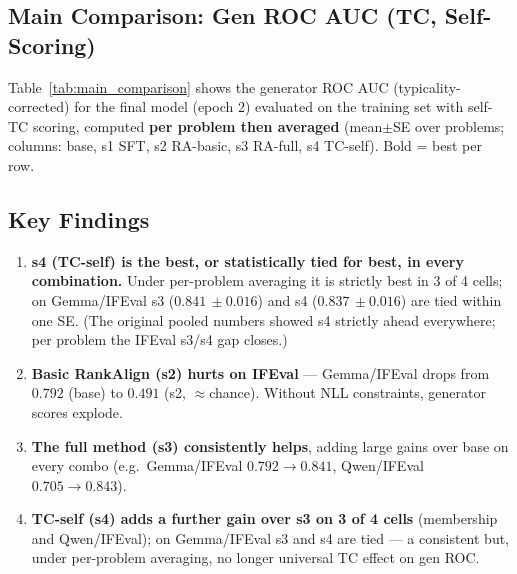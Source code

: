 \documentclass[11pt,a4paper]{article}
\newcommand{\se}[1]{{\,\scriptstyle\pm#1}}
\begin{document}
\subsection{Main Comparison: Gen ROC AUC (TC, Self-Scoring)}

Table~\ref{tab:main_comparison} shows the generator ROC AUC (typicality-corrected) for the final
model (epoch 2) evaluated on the training set with self-TC scoring, computed \textbf{per problem
then averaged} (mean$\pm$SE over problems; columns: base, s1 SFT, s2 RA-basic, s3 RA-full, s4
TC-self). Bold = best per row.

\begin{table}[H]
\centering
\caption{Generator ROC AUC (TC, self-scoring) at epoch 2, per-problem mean$\pm$SE. Bold = best per
row. (Original pooled values: Gemma/Mem 0.851/0.941/0.948/0.976; Gemma/IFEval
0.670/0.586/0.482/0.753/0.801; Qwen/Mem 0.799/0.902/0.880/0.899/0.969; Qwen/IFEval
0.606/0.599/0.558/0.711/0.743.)}
\label{tab:main_comparison}

\end{table}

\subsection{Key Findings}

\begin{enumerate}
\item \textbf{s4 (TC-self) is the best, or statistically tied for best, in every combination.}
Under per-problem averaging it is strictly best in 3 of 4 cells; on Gemma/IFEval s3 ($0.841\se{0.016}$) and s4 ($0.837\se{0.016}$) are tied within one SE. (The original pooled numbers showed s4 strictly ahead everywhere; per problem the IFEval s3/s4 gap closes.)
\item \textbf{Basic RankAlign (s2) hurts on IFEval} --- Gemma/IFEval drops from $0.792$ (base) to $0.491$ (s2, $\approx$chance). Without NLL constraints, generator scores explode.
\item \textbf{The full method (s3) consistently helps}, adding large gains over base on every combo (e.g.\ Gemma/IFEval $0.792\!\to\!0.841$, Qwen/IFEval $0.705\!\to\!0.843$).
\item \textbf{TC-self (s4) adds a further gain over s3 on 3 of 4 cells} (membership and Qwen/IFEval); on Gemma/IFEval s3 and s4 are tied --- a consistent but, under per-problem averaging, no longer universal TC effect on gen ROC.
\end{enumerate}
\end{document}
